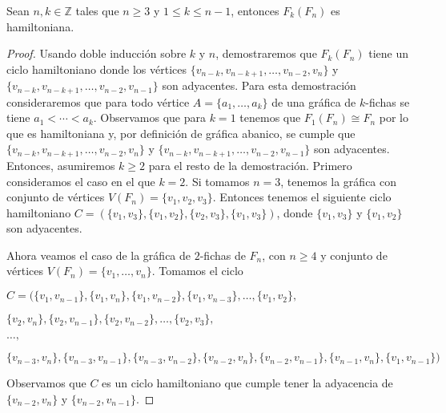         \begin{teorema}
        \label{teo:hamilt-SFan}
            Sean $n,k \in \mathbb{Z}$ tales que $n \geq 3$ y $1 \leq k \leq n-1$,
            entonces $F_k(F_n)$ es hamiltoniana.
        \end{teorema}
    
        
        \begin{proof}
            Usando doble inducci\'on sobre $k$ y $n$, demostraremos que
            $F_k(F_n)$ tiene un ciclo hamiltoniano donde los v\'ertices
            $\{v_{n-k}, v_{n-k+1}, \dots, v_{n-2}, v_n\}$ y $\{v_{n-k},
            v_{n-k+1}, \dots, v_{n-2}, v_{n-1}\}$ son adyacentes. Para esta
            demostraci\'on consideraremos que para todo v\'ertice $A = \{a_1,
            \dots, a_k\}$ de una gr\'afica de $k$-fichas se tiene $a_1 < \cdots
            < a_k$. Observamos que para $k =1$ tenemos que $F_1(F_n) \cong F_n$
            por lo que es hamiltoniana y, por definici\'on de gr\'afica abanico,
            se cumple que $\{v_{n-k}, v_{n-k+1}, \dots, v_{n-2}, v_n\}$ y
            $\{v_{n-k}, v_{n-k+1}, \dots, v_{n-2}, v_{n-1}\}$ son adyacentes.
            Entonces, asumiremos $k \geq 2$ para el resto de la demostraci\'on.
            Primero consideramos el caso en el que $k =2$. Si tomamos $n = 3$,
            tenemos la gr\'afica con conjunto de v\'ertices $V(F_n)=\{v_1, v_2,
            v_3\}$. Entonces tenemos el siguiente ciclo hamiltoniano $C=
            (\{v_1,v_3\},\{v_1,v_2\},\{v_2,v_3\}, \{v_1,v_3\})$, donde $\{v_1,
            v_3\}$ y $\{v_1, v_2\}$ son adyacentes. 
            
            Ahora veamos el caso de la gr\'afica de $2$-fichas de $F_n$, con $n
            \geq 4$ y conjunto de v\'ertices $V(F_n)=\{v_1,\dots, v_n\}$.
            Tomamos el ciclo
    
            $C = (\{v_1, v_{n-1}\},\{v_1, v_n\},\{v_1, v_{n-2}\}, \{v_1,
            v_{n-3}\}, \dots, \{v_1, v_2\},$
            
            $\{v_2, v_n\}, \{v_2, v_{n-1}\}, \{v_2, v_{n-2}\},
            \dots, \{v_2, v_3\},$
    
            $ \dots,$
    
            $\{v_{n-3},v_n\}, \{v_{n-3}, v_{n-1}\},\{v_{n-3},v_{n-2}\},
            \{v_{n-2}, v_n\},\{v_{n-2}, v_{n-1}\}, \{v_{n-1}, v_n\}, \{v_1,
            v_{n-1}\})$
    
            Observamos que $C$ es un ciclo hamiltoniano que cumple tener la
            adyacencia de  $\{v_{n-2}, v_n\}$ y $\{v_{n-2}, v_{n-1}\}$. 
    

\end{proof}
